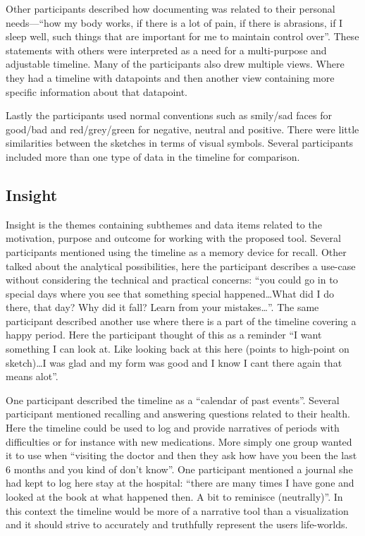 \documentclass[UKenglish]{uiophd}
\begin{document}
		Other participants described how documenting was related to their personal needs---``how my body works, if there is a lot of pain, if there is abrasions, if I sleep well, such things that are important for me to maintain control over''. These statements with others were interpreted as a need for a multi-purpose and adjustable timeline. Many of the participants also drew multiple views. Where they had a timeline with datapoints and then another view containing more specific information about that datapoint.

		Lastly the participants used normal conventions such as smily/sad faces for good/bad and red/grey/green for negative, neutral and positive. There were little similarities between the sketches in terms of visual symbols. Several participants included more than one type of data in the timeline for comparison.  
	\subsection{Insight}
		Insight is the themes containing subthemes and data items related to the motivation, purpose and outcome for working with the proposed tool. Several participants mentioned using the timeline as a memory device for recall. Other talked about the analytical possibilities, here the participant describes a use-case without considering the technical and practical concerns: ``you could go in to special days where you see that something special happened\dots What did I do there, that day? Why did it fall? Learn from your mistakes\dots''. The same participant described another use where there is a part of the timeline covering a happy period. Here the participant thought of this as a reminder ``I want something I can look at. Like looking back at this here (points to high-point on sketch)\dots I was glad and my form was good and I know I cant there again that means alot''. 

		One participant described the timeline as a ``calendar of past events''. Several participant mentioned recalling and answering questions related to their health. Here the timeline could be used to log and provide narratives of periods with difficulties or for instance with new medications. More simply one group wanted it to use when ``visiting the doctor and then they ask how have you been the last 6 months and you kind of don't know''. One participant mentioned a journal she had kept to log here stay at the hospital: ``there are many times I have gone and looked at the book at what happened then. A bit to reminisce (neutrally)''. In this context the timeline would be more of a narrative tool than a visualization and it should strive to accurately and truthfully represent the users life-worlds. 
\end{document}
